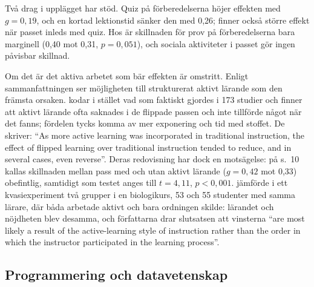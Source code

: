 Två drag i upplägget har stöd.  Quiz på förberedelserna höjer effekten med
\(g = 0{,}19\), och en kortad lektionstid sänker den med
0,26\autocite[9]{vanAlten2019}; \textcite{HewLo2018} finner också större
effekt när passet inleds med quiz.  Hos \textcite[7]{LagSaele2019} är
skillnaden för prov på förberedelserna bara marginell (0,40 mot 0,31,
\(p = 0{,}051\)), och sociala aktiviteter i passet gör ingen påvisbar
skillnad.

Om det är det aktiva arbetet som bär effekten är omstritt.  Enligt
sammanfattningen ser \textcite{Strelan2020} möjligheten till strukturerat
aktivt lärande som den främsta orsaken.  \textcite{Kapur2022} kodar i
stället vad som faktiskt gjordes i 173 studier och finner att aktivt
lärande ofta saknades i de flippade passen och inte tillförde något när
det fanns; fördelen tycks komma av mer exponering och tid med stoffet.
De skriver: \enquote{As more active learning was incorporated in
traditional instruction, the effect of flipped learning over traditional
instruction tended to reduce, and in several cases, even
reverse}\autocite[12]{Kapur2022}.  Deras redovisning har dock en
motsägelse: på s.~10 kallas skillnaden mellan pass med och utan aktivt
lärande (\(g = 0{,}42\) mot 0,33) obefintlig, samtidigt som testet anges
till \(t = 4{,}11\), \(p < 0{,}001\).  \textcite{Jensen2015} jämförde i
ett kvasiexperiment två grupper i en biologikurs, 53 och 55 studenter med
samma lärare, där båda arbetade aktivt och bara ordningen skilde: lärandet
och nöjdheten blev desamma, och författarna drar slutsatsen att vinsterna
\enquote{are most likely a result of the active-learning style of
instruction rather than the order in which the instructor participated in
the learning process}.

\subsection{Programmering och datavetenskap}

